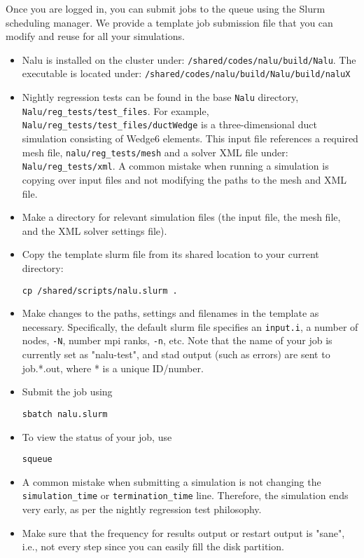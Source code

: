 \documentclass[letterpaper, 11pt]{article}
\begin{document}
\noindent
Once you are logged in, you can submit jobs to the queue using the Slurm 
scheduling manager. We provide a template job submission file that you can 
modify and reuse for all your simulations.
\begin{itemize}[noitemsep]
   \item Nalu is installed on the cluster under: \texttt{/shared/codes/nalu/build/Nalu}. 
   The executable is located under: \texttt{/shared/codes/nalu/build/Nalu/build/naluX}
   \item Nightly regression tests can be found in the base \texttt{Nalu} directory, \texttt{Nalu/reg\_tests/test\_files}.
   For example, \texttt{Nalu/reg\_tests/test\_files/ductWedge} is a three-dimensional duct simulation consisting of Wedge6 elements. This input file references a required mesh file, \texttt{nalu/reg\_tests/mesh} and a solver XML file under: \texttt{Nalu/reg\_tests/xml}. A common mistake when running a simulation is copying over input files and not modifying the paths to the mesh and XML file.
    \item Make a directory for relevant simulation files (the input file, 
        the mesh file, and the XML solver settings file). 
    \item Copy the template slurm file from its shared location to your current
        directory: 

        \begin{center}
        \texttt{cp /shared/scripts/nalu.slurm .}
        \end{center}
    \item Make changes to the paths, settings and filenames in the template as
        necessary. Specifically, the default slurm file specifies an \texttt{input.i}, a number of nodes, \texttt{-N}, number mpi ranks, \texttt{-n}, etc. Note that the name of your job is currently set as "nalu-test", and stad output (such as errors) are sent to job.*.out, where * is a unique ID/number.
    \item Submit the job using 

        \begin{center}
        \texttt{sbatch nalu.slurm}
        \end{center}
    \item To view the status of your job, use 

        \begin{center}
        \texttt{squeue}
        \end{center}
        \item A common mistake when submitting a simulation is not changing the \texttt{simulation\_time} or \texttt{termination\_time} line. Therefore, the simulation ends very early, as per the nightly regression test philosophy.
        \item Make sure that the frequency for results output or restart output is "sane", i.e., not every step since you can easily fill the disk partition.
\end{itemize}
\end{document}
